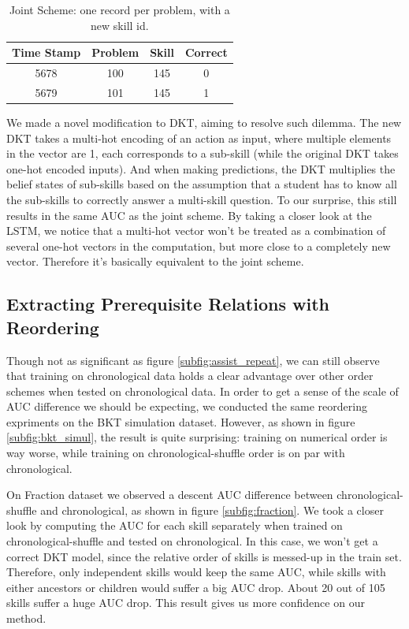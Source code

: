 \begin{table}[]
\centering
\begin{tabular}{|c|c|c|c|}
\hline
Time Stamp & Problem & Skill & Correct \\ \hline
5678       & 100     & 145   & 0       \\ \hline
5679       & 101     & 145   & 1       \\ \hline
\end{tabular}
\caption{Joint Scheme: one record per problem, with a new skill id.}
\label{tb:joint}
\end{table}

We made a novel modification to DKT, aiming to resolve such dilemma. The new DKT takes a multi-hot encoding of an action as input, where multiple elements in the vector are 1, each corresponds to a sub-skill (while the original DKT takes one-hot encoded inputs). And when making predictions, the DKT multiplies the belief states of sub-skills based on the assumption that a student has to know all the sub-skills to correctly answer a multi-skill question. To our surprise, this still results in the same AUC as the joint scheme. By taking a closer look at the LSTM, we notice that a multi-hot vector won't be treated as a combination of several one-hot vectors in the computation, but more close to a completely new vector. Therefore it's basically equivalent to the joint scheme.

\subsection{Extracting Prerequisite Relations with Reordering}

Though not as significant as figure \ref{subfig:assist_repeat}, we can still observe that training on chronological data holds a clear advantage over other order schemes when tested on chronological data. In order to get a sense of the scale of AUC difference we should be expecting, we conducted the same reordering expriments on the BKT simulation dataset. However, as shown in figure \ref{subfig:bkt_simul}, the result is quite surprising: training on numerical order is way worse, while training on chronological-shuffle order is on par with chronological. 

On Fraction dataset we observed a descent AUC difference between chronological-shuffle and chronological, as shown in figure \ref{subfig:fraction}. We took a closer look by computing the AUC for each skill separately when trained on chronological-shuffle and tested on chronological. In this case, we won't get a correct DKT model, since the relative order of skills is messed-up in the train set. Therefore, only independent skills would keep the same AUC, while skills with either ancestors or children would suffer a big AUC drop. About 20 out of 105 skills suffer a huge AUC drop. This result gives us more confidence on our method.


